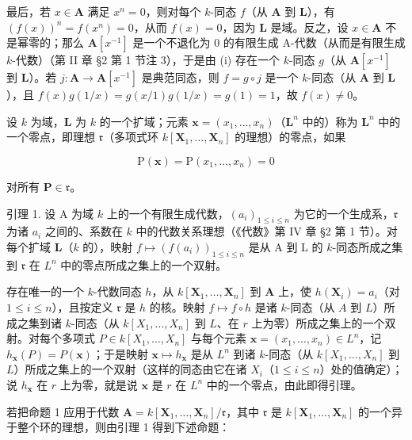 最后，若 \(x \in \mathbf{A}\) 满足 \(x^n = 0\)，则对每个 \(k\)-同态 \(f\)（从 \(\mathbf{A}\) 到 \(\mathbf{L}\)），有 \((f(x))^n = f(x^n) = 0\)，从而 \(f(x) = 0\)，因为 \(\mathbf{L}\) 是域。反之，设 \(x \in \mathbf{A}\) 不是幂零的；那么 \(\mathbf{A}[x^{-1}]\) 是一个不退化为 0 的有限生成 A-代数（从而是有限生成 \(k\)-代数）（第 II 章 §2 第 1 节注 3），于是由 (i) 存在一个 \(k\)-同态 \(g\)（从 \(\mathbf{A}[x^{-1}]\) 到 \(\mathbf{L}\)）。若 \(j: \mathbf{A} \to \mathbf{A}[x^{-1}]\) 是典范同态，则 \(f = g \circ j\) 是一个 \(k\)-同态（从 \(\mathbf{A}\) 到 \(\mathbf{L}\)），且 \(f(x)g(1/x) = g(x/1)g(1/x) = g(1) = 1\)，故 \(f(x) \neq 0\)。

设 \(k\) 为域，\(\mathbf{L}\) 为 \(k\) 的一个扩域；元素 \(\mathbf{x} = (x_1, \ldots, x_n)\)（\(\mathbf{L}^n\) 中的）称为 \(\mathbf{L}^n\) 中的一个零点，即理想 \(\mathfrak{r}\)（多项式环 \(k[\mathbf{X}_1, \ldots, \mathbf{X}_n]\) 的理想）的零点，如果

\[
\mathrm{P} (\mathbf {x}) = \mathrm{P} (x _ {1}, \dots , x _ {n}) = 0
\]

对所有 \(\mathbf{P} \in \mathfrak{r}\)。

引理 1. 设 A 为域 \(k\) 上的一个有限生成代数，\((a_i)_{1 \leqslant i \leqslant n}\) 为它的一个生成系，\(\mathfrak{r}\) 为诸 \(a_i\) 之间的、系数在 \(k\) 中的代数关系理想（《代数》第 IV 章 §2 第 1 节）。对每个扩域 \(\mathbf{L}\)（\(k\) 的），映射 \(f \mapsto (f(a_i))_{1 \leqslant i \leqslant n}\) 是从 A 到 L 的 \(k\)-同态所成之集到 \(\mathfrak{r}\) 在 \(L^n\) 中的零点所成之集上的一个双射。

存在唯一的一个 \(k\)-代数同态 \(h\)，从 \(k[\mathbf{X}_1, \ldots, \mathbf{X}_n]\) 到 \(\mathbf{A}\) 上，使 \(h(\mathbf{X}_i) = a_i\)（对 \(1 \leqslant i \leqslant n\)），且按定义 \(\mathfrak{r}\) 是 \(h\) 的核。映射 \(f \mapsto f \circ h\) 是诸 \(k\)-同态（从 \(A\) 到 \(L\)）所成之集到诸 \(k\)-同态（从 \(k[X_1, \ldots, X_n]\) 到 \(L\)、在 \(r\) 上为零）所成之集上的一个双射。对每个多项式 \(P \in k[X_1, \ldots, X_n]\) 与每个元素 \(\mathbf{x} = (x_1, \ldots, x_n) \in L^n\)，记 \(h_{\mathbf{x}}(P) = P(\mathbf{x})\)；于是映射 \(\mathbf{x} \mapsto h_{\mathbf{x}}\) 是从 \(L^n\) 到诸 \(k\)-同态（从 \(k[X_1, \ldots, X_n]\) 到 \(L\)）所成之集上的一个双射（这样的同态由它在诸 \(X_i\)（\(1 \leqslant i \leqslant n\)）处的值确定）；说 \(h_{\mathbf{x}}\) 在 \(r\) 上为零，就是说 \(\mathbf{x}\) 是 \(r\) 在 \(L^n\) 中的一个零点，由此即得引理。

若把命题 1 应用于代数 \(\mathbf{A} = k[\mathbf{X}_1, \ldots, \mathbf{X}_n] / \mathfrak{r}\)，其中 \(\mathfrak{r}\) 是 \(k[\mathbf{X}_1, \ldots, \mathbf{X}_n]\) 的一个异于整个环的理想，则由引理 1 得到下述命题：

